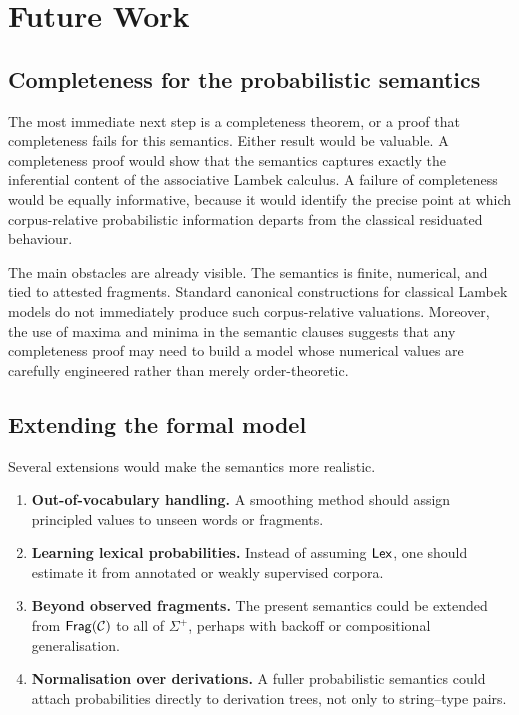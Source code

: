 \chapter{Future Work}

\section{Completeness for the probabilistic semantics}
The most immediate next step is a completeness theorem, or a proof that completeness fails for
this semantics. Either result would be valuable. A completeness proof would show that the
semantics captures exactly the inferential content of the associative Lambek calculus. A failure
of completeness would be equally informative, because it would identify the precise point at
which corpus-relative probabilistic information departs from the classical residuated behaviour.

The main obstacles are already visible. The semantics is finite, numerical, and tied to attested
fragments. Standard canonical constructions for classical Lambek models do not immediately
produce such corpus-relative valuations. Moreover, the use of maxima and minima in the
semantic clauses suggests that any completeness proof may need to build a model whose
numerical values are carefully engineered rather than merely order-theoretic.


\section{Extending the formal model}
Several extensions would make the semantics more realistic.
\begin{enumerate}[label=(\roman*)]
    \item \textbf{Out-of-vocabulary handling.} A smoothing method should assign principled values to
    unseen words or fragments.
    \item \textbf{Learning lexical probabilities.} Instead of assuming $\mathsf{Lex}$, one should estimate it from
    annotated or weakly supervised corpora.
    \item \textbf{Beyond observed fragments.} The present semantics could be extended from
    $\mathsf{Frag}(\mathcal C)$ to all of $\Sigma^+$, perhaps with backoff or compositional generalisation.
    \item \textbf{Normalisation over derivations.} A fuller probabilistic semantics could attach
    probabilities directly to derivation trees, not only to string--type pairs.
\end{enumerate}


